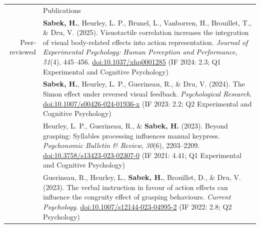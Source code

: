\documentclass[a4paper, 11pt]{article}
\newcommand{\headingfont}{\Large\color{PineGreen}}
\newcommand{\metric}[1]{{\small\color{darkgray}(#1)}}
\newenvironment{SectionTable}[1]{
	\renewcommand*{\arraystretch}{1.1}
	\setlength{\tabcolsep}{8pt}
	\begin{longtable}{Rp{5.15in}} & #1 \\*}
{\end{longtable}\vspace{2pt}}
\begin{document}
\begin{SectionTable}{\headingfont Publications}
	Peer-reviewed &
	\textbf{Sabek, H.}, Heurley, L. P., Brunel, L., Vanborren, H., Brouillet, T., \& Dru, V. (2025).
	Visuotactile correlation increases the integration of visual body-related effects into action representation.
	\textit{Journal of Experimental Psychology: Human Perception and Performance}, \textit{51}(4), 445--456.
	\href{https://doi.org/10.1037/xhp0001285}{doi:10.1037/xhp0001285}
	\metric{IF 2024: 2.3; Q1 Experimental and Cognitive Psychology}\\

	&
	\textbf{Sabek, H.}, Heurley, L. P., Guerineau, R., \& Dru, V. (2024).
	The Simon effect under reversed visual feedback.
	\textit{Psychological Research}.
	\href{https://doi.org/10.1007/s00426-024-01936-x}{doi:10.1007/s00426-024-01936-x}
	\metric{IF 2023: 2.2; Q2 Experimental and Cognitive Psychology}\\

	&
	Heurley, L. P., Guerineau, R., \& \textbf{Sabek, H.} (2023).
	Beyond grasping: Syllables processing influences manual keypress.
	\textit{Psychonomic Bulletin \& Review}, \textit{30}(6), 2203--2209.
	\href{https://doi.org/10.3758/s13423-023-02307-0}{doi:10.3758/s13423-023-02307-0}
	\metric{IF 2021: 4.41; Q1 Experimental and Cognitive Psychology}\\

	&
	Guerineau, R., Heurley, L., \textbf{Sabek, H.}, Brouillet, D., \& Dru, V. (2023).
	The verbal instruction in favour of action effects can influence the congruity effect of grasping behaviours.
	\textit{Current Psychology}.
	\href{https://doi.org/10.1007/s12144-023-04995-2}{doi:10.1007/s12144-023-04995-2}
	\metric{IF 2022: 2.8; Q2 Psychology}\\
\end{SectionTable}
\end{document}
